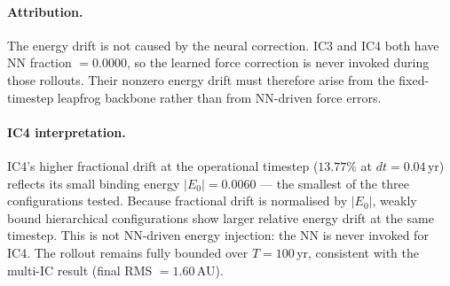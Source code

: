 \documentclass[12pt]{article}
\begin{document}
\begin{table}[H]
\centering
\caption{Maximum fractional energy drift $|\Delta E/E_0|_{\max}$ for \texttt{SIMON} over $T=100$\,yr. The main experiments use $dt=0.04$\,yr.}
\label{tab:energy_dt_sweep}
\end{table}

\paragraph{Attribution.}
The energy drift is not caused by the neural correction. IC3 and IC4
both have NN fraction $=0.0000$, so the learned force correction is
never invoked during those rollouts. Their nonzero energy drift must
therefore arise from the fixed-timestep leapfrog backbone rather than
from NN-driven force errors.

\paragraph{IC4 interpretation.}
IC4's higher fractional drift at the operational timestep ($13.77\%$
at $dt=0.04$\,yr) reflects its small binding energy $|E_0|=0.0060$ —
the smallest of the three configurations tested. Because fractional
drift is normalised by $|E_0|$, weakly bound hierarchical
configurations show larger relative energy drift at the same timestep.
This is not NN-driven energy injection: the NN is never invoked for
IC4. The rollout remains fully bounded over $T=100$\,yr, consistent
with the multi-IC result (final RMS $=1.60$\,AU).
\end{document}
